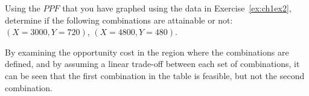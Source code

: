 \begin{enumialphparenastyle}
\begin{econex}
\begin{econsolution}
\begin{center*}
\end{center*}
\end{econsolution}
\end{econex}

\begin{econex}\label{ex:ch1ex3}
Using the $PPF$ that you have graphed using the data in Exercise~\ref{ex:ch1ex2}, determine if the following combinations are attainable or not: $(X=3000,Y=720)$, $(X=4800,Y=480)$.
\begin{econsolution}
	By examining the opportunity cost in the region where the combinations are defined, and by assuming a linear trade-off between each set of combinations, it can be seen that the first combination in the table is feasible, but not the second combination.
	
\end{econsolution}
\end{econex}


\end{enumialphparenastyle}

